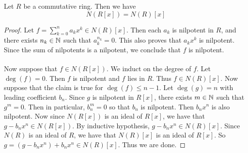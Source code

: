 \documentclass[a4paper]{article}
\begin{document}
\begin{prp}{}{} Let $R$ be a commutative ring. Then we have $$N(R[x])=N(R)[x]$$ \tcbline
\begin{proof}
Let $f=\sum_{k=0}^na_kx^k\in N(R)[x]$. Then each $a_k$ is nilpotent in $R$, and there exists $n_k\in\mathbb{N}$ such that $a_k^{n_k}=0$. This also proves that $a_kx^k$ is nilpotent. Since the sum of nilpotents is a nilpotent, we conclude that $f$ is nilpotent. \\~\\

Now suppose that $f\in N(R[x])$. We induct on the degree of $f$. Let $\deg(f)=0$. Then $f$ is nilpotent and $f$ lies in $R$. Thus $f\in N(R)[x]$. Now suppose that the claim is true for $\deg(f)\leq n-1$. Let $\deg(g)=n$ with leading coefficient $b_n$. Since $g$ is nilpotent in $R[x]$, there exists $m\in\mathbb{N}$ such that $g^m=0$. Then in particular, $b_n^m=0$ so that $b_n$ is nilpotent. Then $b_nx^n$ is also nilpotent. Now since $N(R[x])$ is an ideal of $R[x]$, we have that $g-b_nx^n\in N(R[x])$. By inductive hypothesis, $g-b_nx^n\in N(R)[x]$. Since $N(R)$ is an ideal of $R$, we have that $N(R)[x]$ is an ideal of $R[x]$. So $g=(g-b_nx^n)+b_nx^n\in N(R)[x]$. Thus we are done. 
\end{proof}
\end{prp}
\end{document}
